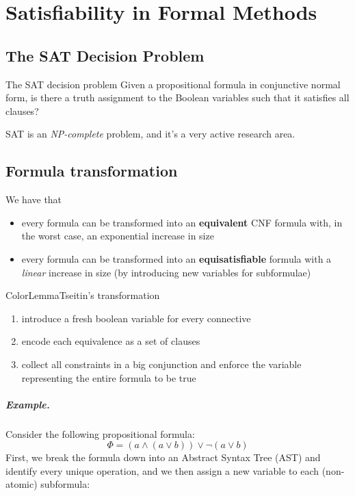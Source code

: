 \documentclass[a4paper, 11pt]{report}
\begin{document}
\makecustomcover

\tableofcontents
\clearpage

\chapter{Satisfiability in Formal Methods}

\section{The SAT Decision Problem}

\begin{defframe}{The SAT decision problem}{}
    Given a propositional formula in conjunctive normal form, is there a truth assignment to the Boolean variables such that it satisfies all clauses?
\end{defframe}

SAT is an \textit{NP-complete} problem, and it's a very active research area.

\section{Formula transformation}

We have that
\begin{itemize}
    \item every formula can be transformed into an \textbf{equivalent} CNF formula with, in the worst case, an exponential increase in size
    \item every formula can be transformed into an \textbf{equisatisfiable} formula with a \textit{linear} increase in size (by introducing new variables for subformulae)
\end{itemize}

\begin{cframe}{ColorLemma}{Tseitin's transformation}
    \vspace{-1em}
\begin{enumerate}
    \item introduce a fresh boolean variable for every connective
    \item encode each equivalence as a set of clauses
    \item collect all constraints in a big conjunction and enforce the variable representing the entire formula to be true
\end{enumerate}
\end{cframe}

\paragraph{Example.}
Consider the following propositional formula:
\begin{equation*}
\Phi = (a \land (a \lor b)) \lor \neg(a \lor b)
\end{equation*}
First, we break the formula down into an Abstract Syntax Tree (AST) and identify every unique operation, and we then assign a new variable to each (non-atomic) subformula:
\end{document}
